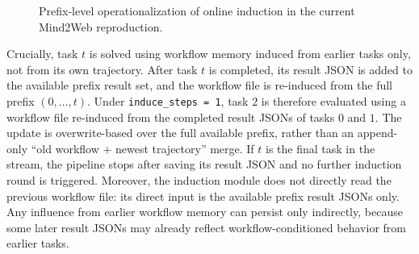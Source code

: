\documentclass{article}
\begin{document}
\begin{figure}[htbp]
\centering
{}
\caption{Prefix-level operationalization of online induction in the current Mind2Web reproduction.}
\label{fig:online-induction-prefix-loop}
\end{figure}

Crucially, task \(t\) is solved using workflow memory induced from
earlier tasks only, not from its own trajectory. After task \(t\) is
completed, its result JSON is added to the available prefix result set,
and the workflow file is re-induced from the full prefix
\((0,\dots,t)\). Under \texttt{induce\_steps = 1}, task \(2\) is
therefore evaluated using a workflow file re-induced from the completed
result JSONs of tasks \(0\) and \(1\). The update is overwrite-based
over the full available prefix, rather than an append-only ``old
workflow + newest trajectory'' merge.
If \(t\) is the final task in the stream, the pipeline stops after
saving its result JSON and no further induction round is triggered.
Moreover, the induction module does not directly read the previous
workflow file: its direct input is the available prefix result JSONs
only. Any influence from earlier workflow memory can persist only
indirectly, because some later result JSONs may already reflect
workflow-conditioned behavior from earlier tasks.
\end{document}
